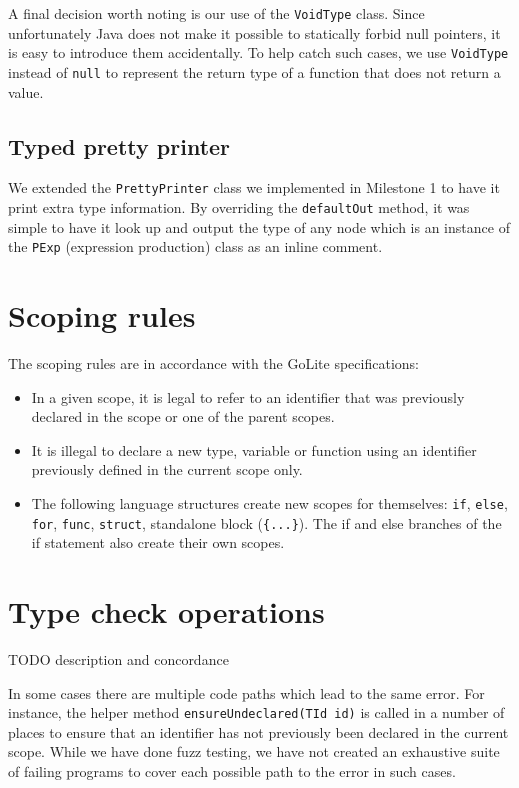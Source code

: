 \documentclass[oneside]{article}
\begin{document}
A final decision worth noting is our use of the \texttt{VoidType} class. Since unfortunately Java does not make it possible to statically forbid null pointers, it is easy to introduce them accidentally. To help catch such cases, we use \texttt{VoidType} instead of \texttt{null} to represent the return type of a function that does not return a value.

\subsection{Typed pretty printer}

We extended the \verb|PrettyPrinter| class we implemented in Milestone 1 to have it print extra type information. By overriding the \verb|defaultOut| method, it was simple to have it look up and output the type of any node which is an instance of the \verb|PExp| (expression production) class as an inline comment.

\section{Scoping rules}

The scoping rules are in accordance with the GoLite specifications:

\begin{itemize}
    \item In a given scope, it is legal to refer to an identifier that was previously declared in the scope or one of the parent scopes.
    \item It is illegal to declare a new type, variable or function using an identifier previously defined in the current scope only.
    \item The following language structures create new scopes for themselves: \texttt{if}, \texttt{else}, \texttt{for}, \texttt{func}, \texttt{struct}, standalone block (\verb|{...}|). The if and else branches of the if statement also create their own scopes.
\end{itemize}

\section{Type check operations}

TODO description and concordance

In some cases there are multiple code paths which lead to the same error. For instance, the helper method \texttt{ensureUndeclared(TId id)} is called in a number of places to ensure that an identifier has not previously been declared in the current scope. While we have done fuzz testing, we have not created an exhaustive suite of failing programs to cover each possible path to the error in such cases.
\end{document}
